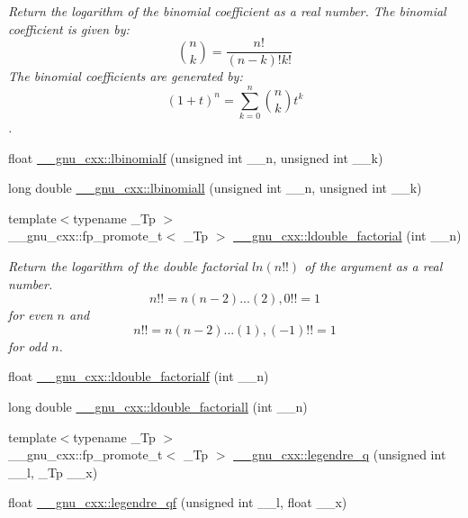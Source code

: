 \begin{DoxyCompactItemize}
\begin{DoxyCompactList}\small\item\em Return the logarithm of the binomial coefficient as a real number. The binomial coefficient is given by\+: \[ \binom{n}{k} = \frac{n!}{(n-k)! k!} \] The binomial coefficients are generated by\+: \[ \left(1 + t\right)^n = \sum_{k=0}^n \binom{n}{k} t^k \]. \end{DoxyCompactList}\item 
float \hyperlink{group__gnu__math__spec__func_ga2fe55bab4211fb240e1eb01341914129}{\+\_\+\+\_\+gnu\+\_\+cxx\+::lbinomialf} (unsigned int \+\_\+\+\_\+n, unsigned int \+\_\+\+\_\+k)
\item 
long double \hyperlink{group__gnu__math__spec__func_ga20e6c250e10e20b9e2c3f68bf9a3d4c1}{\+\_\+\+\_\+gnu\+\_\+cxx\+::lbinomiall} (unsigned int \+\_\+\+\_\+n, unsigned int \+\_\+\+\_\+k)
\item 
{\footnotesize template$<$typename \+\_\+\+Tp $>$ }\\\+\_\+\+\_\+gnu\+\_\+cxx\+::fp\+\_\+promote\+\_\+t$<$ \+\_\+\+Tp $>$ \hyperlink{group__gnu__math__spec__func_ga43bf9a20282d5b9237bf352682a48395}{\+\_\+\+\_\+gnu\+\_\+cxx\+::ldouble\+\_\+factorial} (int \+\_\+\+\_\+n)
\begin{DoxyCompactList}\small\item\em Return the logarithm of the double factorial $ ln(n!!) $ of the argument as a real number. \[ n!! = n(n-2)...(2), 0!! = 1 \] for even $ n $ and \[ n!! = n(n-2)...(1), (-1)!! = 1 \] for odd $ n $. \end{DoxyCompactList}\item 
float \hyperlink{group__gnu__math__spec__func_ga33ecc59a7ff139b483cebf42ecd4fe79}{\+\_\+\+\_\+gnu\+\_\+cxx\+::ldouble\+\_\+factorialf} (int \+\_\+\+\_\+n)
\item 
long double \hyperlink{group__gnu__math__spec__func_gae8fa4b4866cfd20349c985b33ed2936e}{\+\_\+\+\_\+gnu\+\_\+cxx\+::ldouble\+\_\+factoriall} (int \+\_\+\+\_\+n)
\item 
{\footnotesize template$<$typename \+\_\+\+Tp $>$ }\\\+\_\+\+\_\+gnu\+\_\+cxx\+::fp\+\_\+promote\+\_\+t$<$ \+\_\+\+Tp $>$ \hyperlink{group__gnu__math__spec__func_gadad5b22d0075dca31690907668af568f}{\+\_\+\+\_\+gnu\+\_\+cxx\+::legendre\+\_\+q} (unsigned int \+\_\+\+\_\+l, \+\_\+\+Tp \+\_\+\+\_\+x)
\item 
float \hyperlink{group__gnu__math__spec__func_ga46cf4d58886af402c6776bc090b4e4a7}{\+\_\+\+\_\+gnu\+\_\+cxx\+::legendre\+\_\+qf} (unsigned int \+\_\+\+\_\+l, float \+\_\+\+\_\+x)

\end{DoxyCompactItemize}
